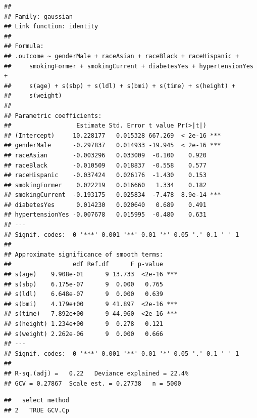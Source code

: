 \documentclass[
]{article}
\newenvironment{Shaded}{\begin{snugshade}}{\end{snugshade}}
\newcommand{\NormalTok}[1]{#1}
\newcommand{\SpecialCharTok}[1]{\textcolor[rgb]{0.81,0.36,0.00}{\textbf{#1}}}
\begin{document}
\begin{verbatim}
## 
## Family: gaussian 
## Link function: identity 
## 
## Formula:
## .outcome ~ genderMale + raceAsian + raceBlack + raceHispanic + 
##     smokingFormer + smokingCurrent + diabetesYes + hypertensionYes + 
##     s(age) + s(sbp) + s(ldl) + s(bmi) + s(time) + s(height) + 
##     s(weight)
## 
## Parametric coefficients:
##                  Estimate Std. Error t value Pr(>|t|)    
## (Intercept)     10.228177   0.015328 667.269  < 2e-16 ***
## genderMale      -0.297837   0.014933 -19.945  < 2e-16 ***
## raceAsian       -0.003296   0.033009  -0.100    0.920    
## raceBlack       -0.010509   0.018837  -0.558    0.577    
## raceHispanic    -0.037424   0.026176  -1.430    0.153    
## smokingFormer    0.022219   0.016660   1.334    0.182    
## smokingCurrent  -0.193175   0.025834  -7.478  8.9e-14 ***
## diabetesYes      0.014230   0.020640   0.689    0.491    
## hypertensionYes -0.007678   0.015995  -0.480    0.631    
## ---
## Signif. codes:  0 '***' 0.001 '**' 0.01 '*' 0.05 '.' 0.1 ' ' 1
## 
## Approximate significance of smooth terms:
##                 edf Ref.df      F p-value    
## s(age)    9.908e-01      9 13.733  <2e-16 ***
## s(sbp)    6.175e-07      9  0.000   0.765    
## s(ldl)    6.648e-07      9  0.000   0.639    
## s(bmi)    4.179e+00      9 41.897  <2e-16 ***
## s(time)   7.892e+00      9 44.960  <2e-16 ***
## s(height) 1.234e+00      9  0.278   0.121    
## s(weight) 2.262e-06      9  0.000   0.666    
## ---
## Signif. codes:  0 '***' 0.001 '**' 0.01 '*' 0.05 '.' 0.1 ' ' 1
## 
## R-sq.(adj) =   0.22   Deviance explained = 22.4%
## GCV = 0.27867  Scale est. = 0.27738   n = 5000
\end{verbatim}

\begin{Shaded}
\end{Shaded}

\begin{verbatim}
##   select method
## 2   TRUE GCV.Cp
\end{verbatim}

\begin{Shaded}
\end{Shaded}
\end{document}
